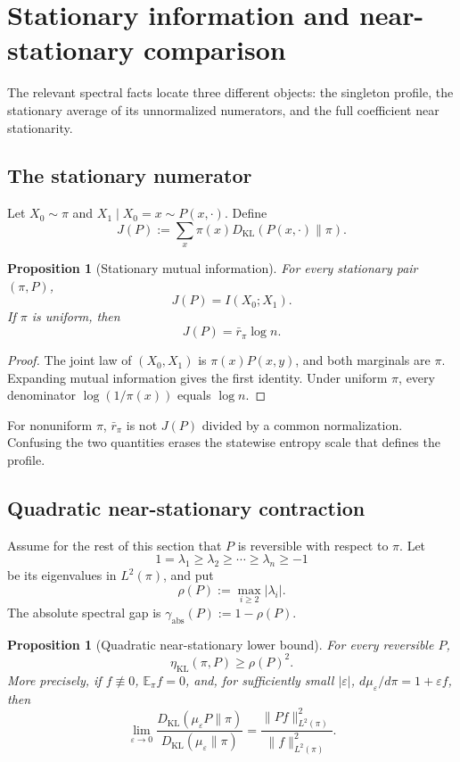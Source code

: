 \documentclass[11pt]{article}
\newtheorem{proposition}[theorem]{Proposition}
\newcommand{\KL}{D_{\mathrm{KL}}}
\newcommand{\etaStat}{\eta_{\mathrm{KL}}(\pi,P)}
\newcommand{\E}{\mathbb{E}}
\begin{document}
\section{Stationary information and near-stationary comparison}
\label{sec:spectral}

The relevant spectral facts locate three different objects: the singleton
profile, the stationary average of its unnormalized numerators, and the full
coefficient near stationarity.

\subsection{The stationary numerator}

Let \(X_0\sim\pi\) and \(X_1\mid X_0=x\sim P(x,\cdot)\).  Define
\[
  J(P)
  :=
  \sum_x\pi(x)\KL(P(x,\cdot)\|\pi).
\]

\begin{proposition}[Stationary mutual information]
\label{prop:stationary-mi}
For every stationary pair \((\pi,P)\),
\[
  J(P)=I(X_0;X_1).
\]
If \(\pi\) is uniform, then
\[
  J(P)=\bar r_\pi\log n.
\]
\end{proposition}

\begin{proof}
The joint law of \((X_0,X_1)\) is \(\pi(x)P(x,y)\), and both marginals are
\(\pi\).  Expanding mutual information gives the first identity.  Under
uniform \(\pi\), every denominator \(\log(1/\pi(x))\) equals \(\log n\).
\end{proof}

For nonuniform \(\pi\), \(\bar r_\pi\) is not \(J(P)\) divided by a common
normalization.  Confusing the two quantities erases the statewise entropy
scale that defines the profile.

\subsection{Quadratic near-stationary contraction}

Assume for the rest of this section that \(P\) is reversible with respect
to \(\pi\).  Let
\[
  1=\lambda_1\ge\lambda_2\ge\cdots\ge\lambda_n\ge-1
\]
be its eigenvalues in \(L^2(\pi)\), and put
\[
  \rho(P):=\max_{i\ge2}|\lambda_i|.
\]
The absolute spectral gap is \(\gamma_{\mathrm{abs}}(P):=1-\rho(P)\).

\begin{proposition}[Quadratic near-stationary lower bound]
\label{prop:quadratic}
For every reversible \(P\),
\[
  \etaStat\ge\rho(P)^2.
\]
More precisely, if \(f\not\equiv0\), \(\E_\pi f=0\), and, for sufficiently
small \(|\varepsilon|\),
\(d\mu_\varepsilon/d\pi=1+\varepsilon f\), then
\[
  \lim_{\varepsilon\to0}
  \frac{\KL(\mu_\varepsilon P\|\pi)}
       {\KL(\mu_\varepsilon\|\pi)}
  =
  \frac{\|Pf\|_{L^2(\pi)}^2}{\|f\|_{L^2(\pi)}^2}.
\]
\end{proposition}
\end{document}
